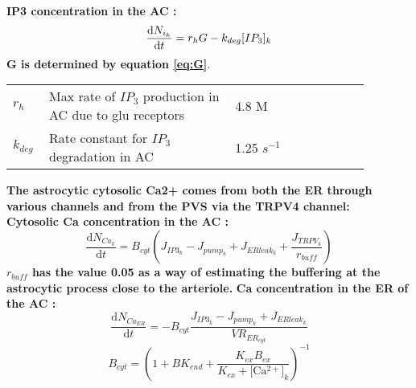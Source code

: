 \documentclass[fleqn]{report}
\numberwithin{equation}{section}
\numberwithin{equation}{section}
\newcommand{\Cak}{\text{[Ca$^{2+}]_k$}}
\newcommand{\microM}{\textmu M}
\begin{document}
	
		\textbf{	\gls{IP3} concentration in the AC  :}
	\begin{equation}
	\dfrac{\mathrm{d}N_{i_k}}{\mathrm{d}t}=r_{h}G-k_{deg}[IP_{3}]_{k}
	\end{equation}
	\textbf{G is determined by equation \ref{eq:G}}. 
	
	\begin{table}[h!]
								\centering
								\begin{tabular}{ p{0.07\linewidth}  >{\footnotesize} p{0.47\linewidth}  >{\footnotesize} p{0.17\linewidth} >{\footnotesize} p{0.17\linewidth} }
									\hline
									$ r_{h} $ 	& Max rate of  $IP_{3}$ production in AC due to glu receptors	& 4.8 \microM 	& \\ 
									$ k_{deg} $ 		& Rate constant for $IP_{3}$ degradation in AC	& 1.25  $s^{-1}$ 				& \\ 
									\hline
								\end{tabular}
							\end{table}
							
							
\textbf{The astrocytic cytosolic Ca2+ comes from both the ER through various channels and from the PVS via the TRPV4 channel:}\\
	
	\textbf{	Cytosolic \gls{Ca} concentration in the AC  :}
		\begin{equation} \label{eq:CaInt}
		\dfrac{\mathrm{d}N_{Ca_k}}{\mathrm{d}t}= B_{cyt} (J_{IP3_{k}}-J_{pump_{k}}+J_{ERleak_{k}}+\frac{J_{TRPV_{k}}}{r_{buff}})
	\end{equation}
	\textbf{$r_{buff}$ has the value 0.05 as a way of estimating the buffering at the astrocytic process close to the arteriole.}
	\textbf{	 \gls{Ca} concentration in the ER of the  AC  :}
			\begin{equation} \label{eq:CaER}
			\dfrac{\mathrm{d}N_{Ca_{ER}}}{\mathrm{d}t}= -B_{cyt} \frac{J_{IP3_{k}}-J_{pump_{k}}+J_{ERleak_{k}}}{VR_{ER_{cyt}}}
		\end{equation}
		\begin{equation}
		B_{cyt}=(1+BK_{end}+\frac{K_{ex}B_{ex}}{K_{ex}+\Cak})^{-1}
		\end{equation}
		
\end{document}
